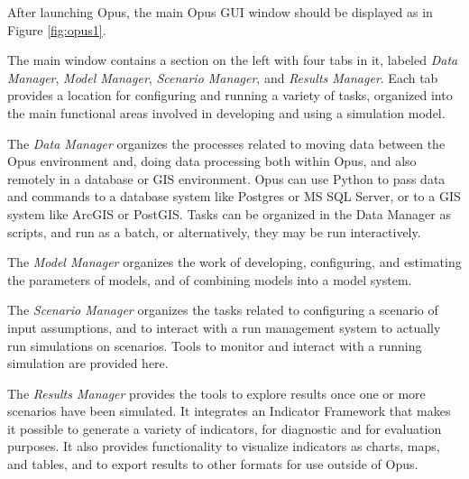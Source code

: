 After launching Opus, the main Opus GUI window should be displayed as
in Figure \ref{fig:opus1}.

The main window contains a section on the left with four tabs in it, labeled \emph{Data Manager}, \emph{Model Manager}, \emph{Scenario Manager}, and \emph{Results Manager}.  Each tab provides a location for configuring and running a variety of tasks, organized into the main functional areas involved in developing and using a simulation model.  

\squishlist
\item The \emph{Data Manager} organizes the processes related to moving data between the Opus environment and, doing data processing both within Opus, and also remotely in a database or GIS environment.  Opus can use Python to pass data and commands to a database system like Postgres or MS SQL Server, or to a GIS system like ArcGIS or PostGIS.  Tasks can be organized in the Data Manager as scripts, and run as a batch, or alternatively, they may be run interactively.
\item The \emph{Model Manager} organizes the work of developing, configuring, and estimating the parameters of models, and of combining models into a model system.
\item The \emph{Scenario Manager} organizes the tasks related to configuring a scenario of input assumptions, and to interact with a run management system to actually run simulations on scenarios.  Tools to monitor and interact with a running simulation are provided here.
\item The \emph{Results Manager} provides the tools to explore results once one or more scenarios have been simulated.  It integrates an Indicator Framework that makes it possible to generate a variety of indicators, for diagnostic and for evaluation purposes.  It also provides functionality to visualize indicators as charts, maps, and tables, and to export results to other formats for use outside of Opus.
\squishend

